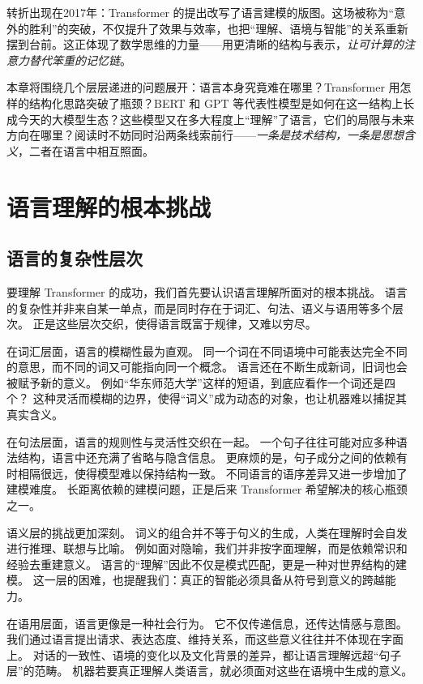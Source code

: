 转折出现在2017年：Transformer 的提出改写了语言建模的版图。这场被称为“意外的胜利”的突破，不仅提升了效果与效率，也把“理解、语境与智能”的关系重新摆到台前。这正体现了数学思维的力量——用更清晰的结构与表示，\emph{让可计算的注意力替代笨重的记忆链}。

本章将围绕几个层层递进的问题展开：语言本身究竟难在哪里？Transformer 用怎样的结构化思路突破了瓶颈？BERT 和 GPT 等代表性模型是如何在这一结构上长成今天的大模型生态？这些模型又在多大程度上“理解”了语言，它们的局限与未来方向在哪里？阅读时不妨同时沿两条线索前行——\emph{一条是技术结构，一条是思想含义}，二者在语言中相互照面。

\section{语言理解的根本挑战}

\subsection{语言的复杂性层次}

要理解 Transformer 的成功，我们首先要认识语言理解所面对的根本挑战。  
语言的复杂性并非来自某一单点，而是同时存在于词汇、句法、语义与语用等多个层次。  
正是这些层次交织，使得语言既富于规律，又难以穷尽。  

在词汇层面，语言的模糊性最为直观。  
同一个词在不同语境中可能表达完全不同的意思，而不同的词又可能指向同一个概念。  
语言还在不断生成新词，旧词也会被赋予新的意义。  
例如“华东师范大学”这样的短语，到底应看作一个词还是四个？  
这种灵活而模糊的边界，使得“词义”成为动态的对象，也让机器难以捕捉其真实含义。  

在句法层面，语言的规则性与灵活性交织在一起。  
一个句子往往可能对应多种语法结构，语言中还充满了省略与隐含信息。  
更麻烦的是，句子成分之间的依赖有时相隔很远，使得模型难以保持结构一致。  
不同语言的语序差异又进一步增加了建模难度。  
长距离依赖的建模问题，正是后来 Transformer 希望解决的核心瓶颈之一。  

语义层的挑战更加深刻。  
词义的组合并不等于句义的生成，人类在理解时会自发进行推理、联想与比喻。  
例如面对隐喻，我们并非按字面理解，而是依赖常识和经验去重建意义。  
语言的“理解”因此不仅是模式匹配，更是一种对世界结构的建模。  
这一层的困难，也提醒我们：真正的智能必须具备从符号到意义的跨越能力。  

在语用层面，语言更像是一种社会行为。  
它不仅传递信息，还传达情感与意图。  
我们通过语言提出请求、表达态度、维持关系，而这些意义往往并不体现在字面上。  
对话的一致性、语境的变化以及文化背景的差异，都让语言理解远超“句子层”的范畴。  
机器若要真正理解人类语言，就必须面对这些在语境中生成的意义。  

